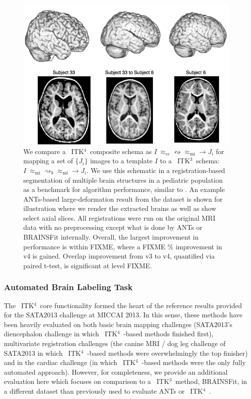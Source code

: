 \documentclass{frontiersSCNS}
\newcommand{\tk}{~ITK$^{\text{4}}$~}
\newcommand{\tkt}{~ITK$^{\text{3}}$~}
\begin{document}
\begin{figure}[t]
\begin{center}
\includegraphics[width=5.5in]{figs/figEval.png}
\caption{We compare a \tk composite schema as $I
~\approx_\text{cc}  \leftrightsquigarrow \approx_\text{mi}  \rightarrow
J_i $ for mapping a set of $\{ J_i \}$ images
to a template $I$ to a \tkt schema:  $I
~\approx_\text{mi} \rightsquigarrow_b    \approx_\text{mi}  \rightarrow
J_i $.  We use this schematic in a registration-based
segmentation of multiple brain structures in a pediatric population as a benchmark
for algorithm performance, similar to \cite{Klein2010}.  An example ANTs-based
large-deformation result from the dataset is shown for illustration
where we render the extracted brains as well as show select axial
slices.  All registrations were run on the original MRI data with no
preprocessing except what is done by ANTs or BRAINSFit internally.
Overall, the largest
improvement in performance is within FIXME, where a FIXME \%
improvement in v4 is gained.  Overlap improvement from v3 to v4, quantified via
paired t-test, is significant at level FIXME.}
\label{fig:eval}
\end{center}
\end{figure}

\subsubsection{Automated Brain Labeling Task}
The \tk core functionality formed the heart of the reference results
provided for the SATA2013 challenge at MICCAI 2013.  In this sense,
these methods have been heavily evaluated on both basic brain mapping
challenges (SATA2013's diencephalon challenge in which \tk-based
methods finished first), multivariate
registration challenges (the canine MRI / dog leg challenge of
SATA2013 in which \tk-based methods were overwhelmingly the top
finisher) and in the cardiac challenge (in which \tk-based methods
were the only fully automated approach).  However, for completeness,
we provide an additional evaluation here which focuses on comparison
to a \tkt method, BRAINSFit, in a different dataset than previously
used to evaluate ANTs or \tk.
\end{document}
